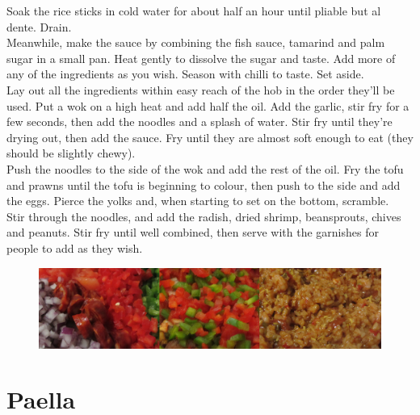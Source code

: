 \documentclass{tufte-book}
\begin{document}
Soak the rice sticks in cold water for about half an hour until pliable but al dente. Drain.
\\Meanwhile, make the sauce by combining the fish sauce, tamarind and palm sugar in a small pan. Heat gently to dissolve the sugar and taste. Add more of any of the ingredients as you wish. Season with chilli to taste. Set aside.
\\Lay out all the ingredients within easy reach of the hob in the order they'll be used. Put a wok on a high heat and add half the oil. Add the garlic, stir fry for a few seconds, then add the noodles and a splash of water. Stir fry until they're drying out, then add the sauce. Fry until they are almost soft enough to eat (they should be slightly chewy).
\\Push the noodles to the side of the wok and add the rest of the oil. Fry the tofu and prawns until the tofu is beginning to colour, then push to the side and add the eggs. Pierce the yolks and, when starting to set on the bottom, scramble.
\\Stir through the noodles, and add the radish, dried shrimp, beansprouts, chives and peanuts. Stir fry until well combined, then serve with the garnishes for people to add as they wish.


\begin{figure}[h]
  \includegraphics[width=\linewidth]{paella.png}
\end{figure}

\section{Paella}
\end{document}
